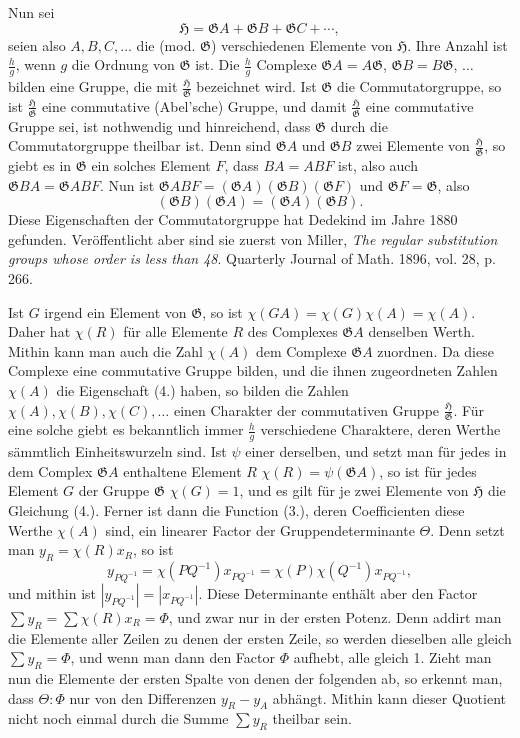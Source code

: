 \documentclass[11pt]{article}
\newcommand{\Hgrp}{\mathfrak{H}}
\newcommand{\Ggrp}{\mathfrak{G}}
\begin{document}
Nun sei
\[
\Hgrp=\Ggrp A+\Ggrp B+\Ggrp C+\cdots,
\]
seien also $A,B,C,\ldots$ die (mod. $\Ggrp$) verschiedenen Elemente von $\Hgrp$. Ihre Anzahl ist $\frac{h}{g}$, wenn $g$ die Ordnung von $\Ggrp$ ist. Die $\frac{h}{g}$ Complexe $\Ggrp A=A\Ggrp$, $\Ggrp B=B\Ggrp$, $\ldots$ bilden eine Gruppe, die mit $\frac{\Hgrp}{\Ggrp}$ bezeichnet wird. Ist $\Ggrp$ die Commutatorgruppe, so ist $\frac{\Hgrp}{\Ggrp}$ eine commutative (Abel'sche) Gruppe, und damit $\frac{\Hgrp}{\Ggrp}$ eine commutative Gruppe sei, ist nothwendig und hinreichend, dass $\Ggrp$ durch die Commutatorgruppe theilbar ist. Denn sind $\Ggrp A$ und $\Ggrp B$ zwei Elemente von $\frac{\Hgrp}{\Ggrp}$, so giebt es in $\Ggrp$ ein solches Element $F$, dass $BA=ABF$ ist, also auch $\Ggrp BA=\Ggrp ABF$. Nun ist $\Ggrp ABF=(\Ggrp A)(\Ggrp B)(\Ggrp F)$ und $\Ggrp F=\Ggrp$, also
\[
(\Ggrp B)(\Ggrp A)=(\Ggrp A)(\Ggrp B).
\]
Diese Eigenschaften der Commutatorgruppe hat Dedekind im Jahre 1880 gefunden. Veröffentlicht aber sind sie zuerst von Miller, \emph{The regular substitution groups whose order is less than 48}. Quarterly Journal of Math. 1896, vol. 28, p. 266.

Ist $G$ irgend ein Element von $\Ggrp$, so ist $\chi(GA)=\chi(G)\chi(A)=\chi(A)$. Daher hat $\chi(R)$ für alle Elemente $R$ des Complexes $\Ggrp A$ denselben Werth. Mithin kann man auch die Zahl $\chi(A)$ dem Complexe $\Ggrp A$ zuordnen. Da diese Complexe eine commutative Gruppe bilden, und die ihnen zugeordneten Zahlen $\chi(A)$ die Eigenschaft (4.) haben, so bilden die Zahlen $\chi(A),\chi(B),\chi(C),\ldots$ einen Charakter der commutativen Gruppe $\frac{\Hgrp}{\Ggrp}$. Für eine solche giebt es bekanntlich immer $\frac{h}{g}$ verschiedene Charaktere, deren Werthe sämmtlich Einheitswurzeln sind. Ist $\psi$ einer derselben, und setzt man für jedes in dem Complex $\Ggrp A$ enthaltene Element $R$ $\chi(R)=\psi(\Ggrp A)$, so ist für jedes Element $G$ der Gruppe $\Ggrp$ $\chi(G)=1$, und es gilt für je zwei Elemente von $\Hgrp$ die Gleichung (4.). Ferner ist dann die Function (3.), deren Coefficienten diese Werthe $\chi(A)$ sind, ein linearer Factor der Gruppendeterminante $\Theta$. Denn setzt man $y_R=\chi(R)x_R$, so ist
\[
y_{PQ^{-1}}=\chi(PQ^{-1})x_{PQ^{-1}}=\chi(P)\chi(Q^{-1})x_{PQ^{-1}},
\]
und mithin ist $|y_{PQ^{-1}}|=|x_{PQ^{-1}}|$. Diese Determinante enthält aber den Factor $\sum y_R=\sum\chi(R)x_R=\Phi$, und zwar nur in der ersten Potenz. Denn addirt man die Elemente aller Zeilen zu denen der ersten Zeile, so werden dieselben alle gleich $\sum y_R=\Phi$, und wenn man dann den Factor $\Phi$ aufhebt, alle gleich 1. Zieht man nun die Elemente der ersten Spalte von denen der folgenden ab, so erkennt man, dass $\Theta:\Phi$ nur von den Differenzen $y_R-y_A$ abhängt. Mithin kann dieser Quotient nicht noch einmal durch die Summe $\sum y_R$ theilbar sein.
\end{document}
